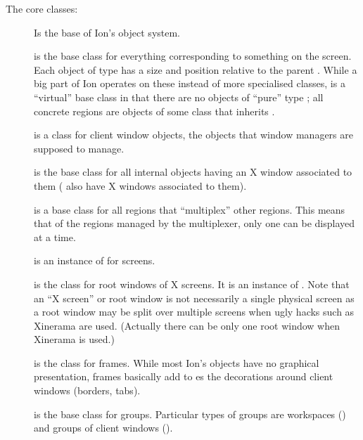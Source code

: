 The core classes:

\begin{description}
  \item[]
    Is the base of Ion's object system.

  \item[]
    is the base class for everything corresponding to something on the
    screen. Each object of type  has a size and  position
    relative to the parent . While a big part of Ion 
    operates on these instead of more specialised classes, 
    is a ``virtual''  base class in that there are no objects of ``pure''
    type ; all concrete regions are objects of some class 
    that inherits .

  \item[] is a class for
    client window objects, the objects that window managers are
    supposed to manage.

  \item[] is the base class for all
    internal objects having an X window associated to them
    ( also have X windows associated to them).
    
  \item[] is a base class for all regions that ``multiplex'' 
    other regions. This means that of the regions managed by the multiplexer,
    only one can be displayed at a time. 
  
  \item[] is an instance of 
    for screens.
    
  \item[] is the class for
    root windows of X screens.
    It is an instance of .
    Note that an ``X screen'' or root window is not necessarily a
    single physical screen as a root window
    may be split over multiple screens when ugly hacks such as 
    Xinerama are used. (Actually there can be only 
    one root window when Xinerama is used.) 
    
  \item[] is the class for frames.
    While most Ion's objects have no graphical presentation, frames 
    basically add to es the decorations around client 
    windows (borders, tabs).
    
  \item[] is the base class for groups.
    Particular types of groups are workspaces 
    ()
    and groups of client windows
    ().
\end{description}


